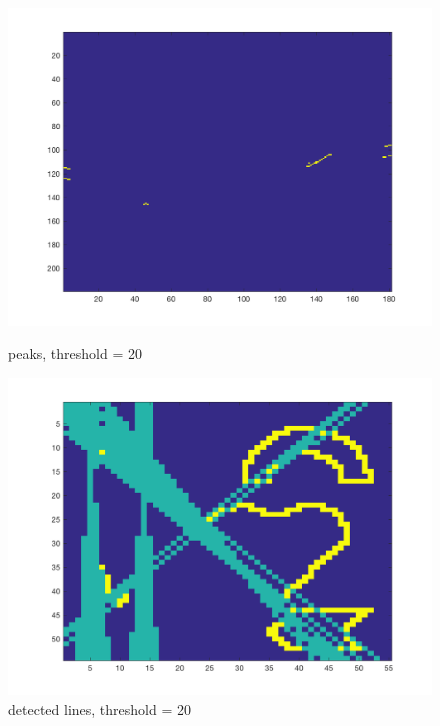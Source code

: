 \documentclass[paper=a4, fontsize=11pt]{scrartcl} %
\numberwithin{equation}{section} %
\numberwithin{figure}{section} %
\numberwithin{table}{section} %
\begin{document}
\begin{figure}[H]
  \centering
  \begin{minipage}[b]{0.49\textwidth}
    \includegraphics[width=\textwidth]{peaks_threshold_20.png}
    \caption{peaks, threshold = 20}
  \end{minipage}
  \hfill
  \begin{minipage}[b]{0.49\textwidth}
    \includegraphics[width=\textwidth]{edgeDetection_threshold_20.png}
    \caption{detected lines, threshold = 20}
  \end{minipage}
\end{figure}
\end{document}
